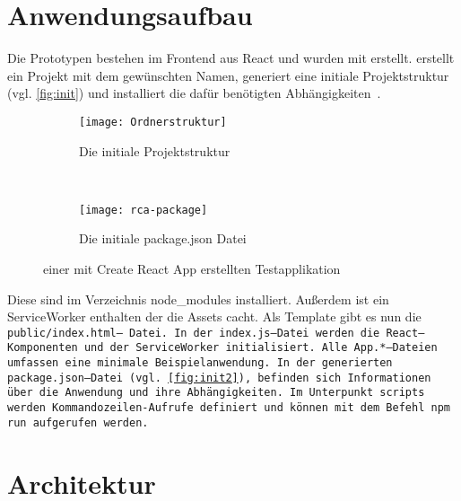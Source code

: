 \section{Anwendungsaufbau}
Die Prototypen bestehen im Frontend aus React und wurden mit  erstellt.  erstellt ein Projekt mit dem gewünschten Namen, generiert eine initiale Projektstruktur (vgl. \autoref{fig:init}) und installiert die dafür benötigten Abhängigkeiten~\cite{create-react}.
\begin{figure}[H]
  \centering
  \begin{subfigure}[t]{0.4\textwidth}
          \texttt{[image: Ordnerstruktur]}
          \caption{Die initiale Projektstruktur}
          \label{fig:init}
  \end{subfigure}
  ~
  \begin{subfigure}[t]{0.4\textwidth}
          \texttt{[image: rca-package]}
          \caption{Die initiale package.json Datei}
          \label{fig:init2}
  \end{subfigure}
  \grayRule
  \caption[Create React App: initiale Testapplikation]{einer mit Create React App erstellten Testapplikation}
  \label{fig:create-react-app}
\end{figure}
%
Diese sind im Verzeichnis node\_modules installiert.
Außerdem ist ein ServiceWorker
enthalten der die \gls{Assets} cacht.
Als Template gibt es nun die \tt{public/index.html}-- Datei. In der \tt{index.js}--Datei werden die React--Komponenten und der ServiceWorker initialisiert.
Alle \tt{App.*}--Dateien umfassen eine minimale Beispielanwendung.
In der generierten \tt{package.json}--Datei (vgl. \autoref{fig:init2}), befinden sich Informationen über die Anwendung und ihre Abhängigkeiten. Im Unterpunkt \tt{scripts} werden Kommandozeilen-Aufrufe definiert und können mit dem Befehl \tt{npm run} aufgerufen werden.
%
%

%
%
%
\section{Architektur}

%
%

%
%

%
%

%
%
